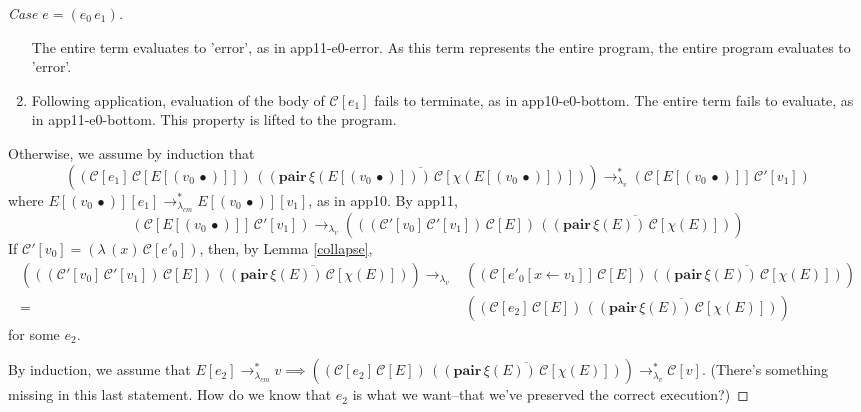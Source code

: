 \documentclass[ms,electronic,twosidetoc,letterpaper,chaptercenter,parttop]{byumsphd}
\newcommand{\pair}[2]{((\mathbf{pair}\,#1)\,#2)}
\newcommand{\eval}[1]{\overline{#1}}
\newcommand{\lvrr}{\rightarrow_{\lambda_v}}
\newcommand{\lvrrs}{\rightarrow_{\lambda_v}^{*}}
\newcommand{\cmrrs}{\rightarrow_{\lambda_{cm}}^{*}}
\newcommand{\C}[1]{\mathcal{C}[#1]}
\newcommand{\Cp}[1]{\mathcal{C}'[#1]}
\newcommand{\abs}[2]{(\lambda\,(#1)\,#2)}
\newcommand{\app}[2]{(#1\,#2)}
\newcommand{\hole}{\bullet}
\begin{document}
\begin{proof}[Case $e=\app{e_0}{e_1}$]
\begin{enumerate}
The entire term evaluates to \scheme'error', as in app11-e0-error. As this term represents the entire program, the entire program evaluates to \scheme'error'.
\item Following application, evaluation of the body of $\C{e_1}$ fails to terminate, as in app10-e0-bottom.
The entire term fails to evaluate, as in app11-e0-bottom. This property is lifted to the program.
\end{enumerate}
Otherwise, we assume by induction that 
\[
\app{\app{\C{e_1}}{\C{E[\app{v_0}{\hole}]}}}{\eval{\pair{\xi(E[\app{v_0}{\hole}])}{\C{\chi(E[\app{v_0}{\hole}])}}}}\lvrrs\app{\C{E[\app{v_0}{\hole}]}}{\Cp{v_1}}
\]
where $E[\app{v_0}{\hole}][e_1]\cmrrs E[\app{v_0}{\hole}][v_1]$, as in app10.
By app11,
\[
\app{\C{E[\app{v_0}{\hole}]}}{\Cp{v_1}}\lvrr\app{\app{\app{\Cp{v_0}}{\Cp{v_1}}}{\C{E}}}{\eval{\pair{\xi(E)}{\C{\chi(E)}}}}
\]
If $\Cp{v_0}=\abs{x}{\C{e'_0}}$, then, by Lemma \ref{collapse},
\begin{align*}
\app{\app{\app{\Cp{v_0}}{\Cp{v_1}}}{\C{E}}}{\eval{\pair{\xi(E)}{\C{\chi(E)}}}}\lvrr &\app{\app{\C{e'_0[x\leftarrow v_1]}}{\C{E}}}{\eval{\pair{\xi(E)}{\C{\chi(E)}}}}\\
= &\app{\app{\C{e_2}}{\C{E}}}{\eval{\pair{\xi(E)}{\C{\chi(E)}}}}
\end{align*}
for some $e_2$.

By induction, we assume that $E[e_2]\cmrrs v\implies\app{\app{\C{e_2}}{\C{E}}}{\eval{\pair{\xi(E)}{\C{\chi(E)}}}}\lvrrs \C{v}$.
(There's something missing in this last statement. How do we know that $e_2$ is what we want--that we've preserved the correct execution?)
\end{proof}
\end{document}
